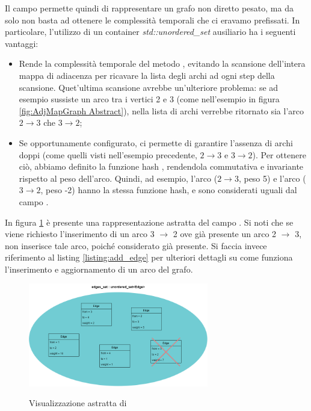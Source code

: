 \noindent Il campo  permette quindi di rappresentare un grafo non diretto pesato, ma da solo non basta ad ottenere le complessità temporali che ci eravamo prefissati. In particolare, l'utilizzo di un container \textit{std::unordered\_set} ausiliario ha i seguenti vantaggi:

\begin{itemize}
    \item Rende \complexityConstant{} la complessità temporale del metodo , evitando la scansione dell'intera mappa di adiacenza per ricavare la lista degli archi ad ogni step della scansione. Quet'ultima scansione avrebbe un'ulteriore problema: se ad esempio sussiste un arco tra i vertici 2 e 3 (come nell'esempio in figura \ref{fig:AdjMapGraph Abstract}), nella lista di archi verrebbe ritornato sia l'arco $2 \rightarrow 3$ che $3 \rightarrow 2$;
    \item Se opportunamente configurato, ci permette di garantire l'assenza di archi doppi (come quelli visti nell'esempio precedente, $2 \rightarrow 3$ e $3 \rightarrow 2$). Per ottenere ciò, abbiamo definito la funzione hash , rendendola commutativa e invariante rispetto al peso dell'arco. Quindi, ad esempio, l'arco ($2 \rightarrow 3$, peso 5) e l'arco ($3 \rightarrow 2$, peso -2) hanno la stessa funzione hash, e sono considerati uguali dal campo .
\end{itemize}

\noindent In figura \ref{fig:edges_set} è presente una rappresentazione astratta del campo . Si noti che se viene richiesto l'inserimento di un arco 3 $\rightarrow$ 2 ove già presente un arco 2 $\rightarrow$ 3,  non inserisce tale arco, poiché considerato già presente. Si faccia invece riferimento al listing \ref{listing:add_edge} per ulteriori dettagli su come funziona l'inserimento e aggiornamento di un arco del grafo. \\

\begin{figure}[!ht]
	\caption{Visualizzazione astratta di }
	\centering
	\includegraphics[width=0.7\textwidth]{./images/edges_setAbstract.png}
	\label{fig:edges_set}
\end{figure}

